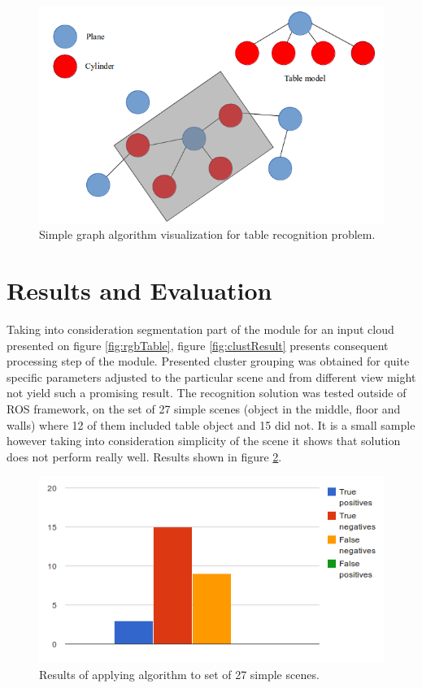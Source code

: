 \documentclass[fontsize=12pt]{article}
\begin{document}
\begin{figure}
\begin{center}
  \includegraphics[scale=0.5]{images/graph}
  \caption{Simple graph algorithm visualization for table recognition problem.}
  \label{graphAlg}
  \end{center}
\end{figure}

\section{Results and Evaluation}
Taking into consideration segmentation part of the module for an input cloud presented on figure \ref{fig:rgbTable}, figure \ref{fig:clustResult} presents consequent processing step of the module. Presented cluster grouping was obtained for quite specific parameters adjusted to the particular scene and from different view might not yield such a promising result.
The recognition solution was tested outside of ROS framework, on the set of 27 simple scenes (object in the middle, floor and walls) where 12 of them included table object and 15 did not. It is a small sample however taking into consideration simplicity of the scene it shows that solution does not perform really well. Results shown in figure \ref{fig:resultChart}.\\

\begin{figure}
\begin{center}
  \includegraphics[scale=0.7]{images/resultChart}
  \caption{Results of applying algorithm to set of 27 simple scenes.}
  \label{fig:resultChart}
  \end{center}
\end{figure}
\end{document}
